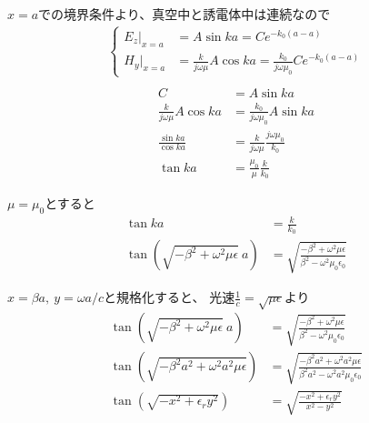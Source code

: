 \documentclass[a4paper,10pt]{bxjsarticle}
\begin{document}
$x=a$での境界条件より、真空中と誘電体中は連続なので
\begin{align*}
    \begin{cases}
        E_z |_{x=a} &= A \sin ka = C e^{-k_0(a-a)} \\
        H_y |_{x=a} &= \frac{k}{j\omega \mu} A \cos ka = \frac{k_0}{j\omega \mu_0} C e^{-k_0(a-a)}
    \end{cases} \\
\end{align*}
\begin{align*}
    C &= A \sin ka \\
    \frac{k}{j\omega \mu} A \cos ka &= \frac{k_0}{j\omega \mu_0} A \sin ka \\
    \frac{\sin ka}{\cos ka} &= \frac{k}{j\omega \mu} \frac{j\omega \mu_0}{k_0}\\
    \tan ka &= \frac{\mu_0}{\mu} \frac{k}{k_0}
\end{align*}

$\mu = \mu_0$とすると
\begin{align*}
    \tan ka &= \frac{k}{k_0}\\
    \tan (\sqrt{-\beta^2+\omega^2 \mu \epsilon}\ a) &= \sqrt{\frac{-\beta^2+\omega^2 \mu \epsilon}{\beta^2-\omega^2 \mu_0 \epsilon_0}}
\end{align*}

$x = \beta a,\ y = \omega a /c$と規格化すると、
光速$\frac{1}{c} = \sqrt{\mu \epsilon} $より
\begin{align*}
    \tan (\sqrt{-\beta^2+\omega^2 \mu \epsilon}\ a) &= \sqrt{\frac{-\beta^2+\omega^2 \mu \epsilon}{\beta^2-\omega^2 \mu_0 \epsilon_0}} \\
    \tan (\sqrt{-\beta^2 a^2+\omega^2 a^2 \mu \epsilon} ) &= \sqrt{\frac{-\beta^2 a^2 +\omega^2 a^2 \mu \epsilon}{\beta^2 a^2 - \omega^2 a^2 \mu_0 \epsilon_0}} \\
    \tan (\sqrt{-x^2 + \epsilon_r y^2 } ) &= \sqrt{\frac{-x^2 + \epsilon_r y^2}{ x^2 - y^2}} \\
\end{align*} 



  
\end{document}
